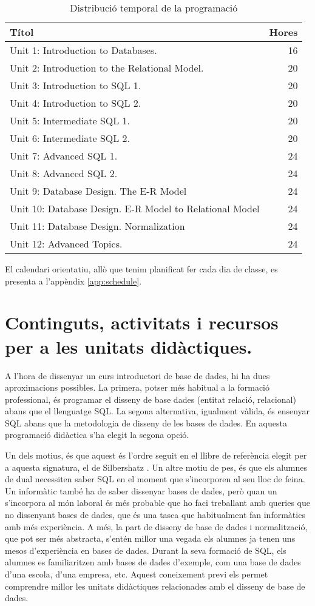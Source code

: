 \documentclass[catalan, a4paper, 12pt, titlepage]{article}
\begin{document}
\begin{table}
	\centering
\begin{tabular}{lr}
 Títol & Hores\\
 \hline
 Unit 1: Introduction to Databases. & 16\\
 Unit 2: Introduction to the Relational Model. & 20  \\
 Unit 3: Introduction to SQL 1. & 20\\
 Unit 4: Introduction to SQL 2. & 20 \\
 Unit 5: Intermediate SQL 1. & 20 \\
 Unit 6: Intermediate SQL 2. & 20 \\
 Unit 7: Advanced SQL 1. & 24 \\
 Unit 8: Advanced SQL 2. & 24\\
 Unit 9: Database Design. The E-R Model & 24\\
 Unit 10: Database Design. E-R Model to Relational Model & 24 \\
 Unit 11: Database Design. Normalization & 24 \\
 Unit 12: Advanced Topics. & 24 \\
\end{tabular}
	\caption{Distribució temporal de la programació} \label{tab:distribuciotemporal}
\end{table}

El calendari orientatiu, allò que tenim planificat fer cada dia de classe, es presenta a l'appèndix \ref{app:schedule}.

\section{Continguts, activitats i recursos per a les unitats didàctiques.}
\label{sec:unitats}

A l'hora de dissenyar un curs introductori de base de dades, hi ha dues aproximacions possibles.
La primera, potser més habitual a la formació professional, és programar el disseny de base dades (entitat relació, relacional) abans que el llenguatge SQL.
La segona alternativa, igualment vàlida, és ensenyar SQL abans que la metodologia de disseny de les bases de dades.
En aquesta programació didàctica s'ha elegit la segona opció.

Un dels motius, és que aquest és l'ordre seguit en el llibre de referència elegit per a aquesta signatura, el de Silbershatz \cite{silbershatz2020}.
Un altre motiu de pes, és que els alumnes de dual necessiten saber SQL en el moment que s'incorporen al seu lloc de feina.
Un informàtic també ha de saber dissenyar bases de dades, però quan un s'incorpora al món laboral és més probable que ho faci treballant amb queries que no dissenyant bases de dades, que és una tasca que habitualment fan informàtics amb més experiència.
A més, la part de disseny de base de dades i normalització, que pot ser més abstracta, s'entén millor una vegada els alumnes ja tenen uns mesos d'experiència en bases de dades.
Durant la seva formació de SQL, els alumnes es familiaritzen amb bases de dades d'exemple, com una base de dades d'una escola, d'una empresa, etc.
Aquest coneixement previ els permet comprendre millor les unitats didàctiques relacionades amb el disseny de base de dades.
\end{document}
